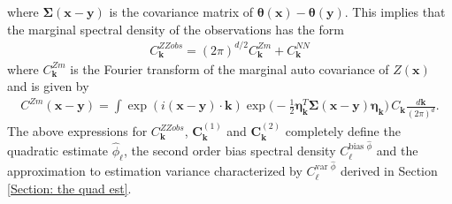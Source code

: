 \documentclass[10pt,noinfoline]{imsart}
\newcommand{\bs}{\boldsymbol}
\begin{document}
where $\bs\Sigma(\bs x-\bs y)$ is the covariance matrix of $\bs\theta(\bs x) - \bs\theta(\bs y)$.
This implies that the marginal spectral density of the observations has the form
\begin{align}
C^{ZZobs}_{\bs k} = {(2\pi)}^{d/2}C^{Zm}_{\bs k} + C^{NN}_{\bs k} \label{eq: CZZobs for nonstationary phase}
\end{align}
where $C^{Zm}_{\bs k}$ is the Fourier transform of the marginal auto covariance of $Z(\bs x)$ and is given by
\begin{align*}
C^{Zm}(\bs x-\bs y)= 
\int  \exp(i(\bs x-\bs y)\cdot \bs k)\exp\!\big(\!-{\textstyle\frac{1}{2}}\bs\eta^T_{\bs k} \bs\Sigma(\bs x-\bs y) \bs \eta_{\bs k}\big)\, C_{\bs k}\frac{d\bs k}{(2\pi)^d}.
\end{align*}
The above expressions for $C^{ZZobs}_{\bs k}$, $\bs C_{\bs k}^{(1)}$ and $\bs C_{\bs k}^{(2)}$ completely define the quadratic estimate $\hat\phi_{\bs \ell}$, the second order bias spectral density $C_{\bs\ell}^{\text{bias }\hat \phi}$ and the approximation to estimation variance characterized by $C_{\bs\ell}^{\text{var }\hat \phi}$ derived in Section \ref{Section: the quad est}.
\end{document}
